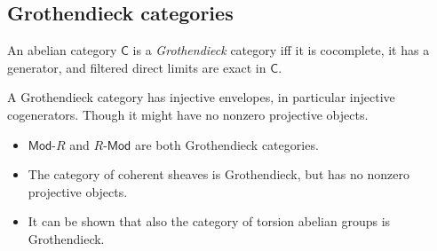 \subsection{Grothendieck categories}
\begin{defn}
	An abelian category $\mathsf{C}$ is a {\em Grothendieck} category iff
	it is cocomplete, it has a generator, and filtered direct limits are exact in $\mathsf{C}$.
\end{defn}

\begin{rem}
	A Grothendieck category has injective envelopes, in particular injective cogenerators.
	Though it might have no nonzero projective objects.
\end{rem}

\begin{ex}\leavevmode\vspace{-.2\baselineskip}
	\begin{itemize}
		\item $\mathsf{Mod}\text{-}R$ and $R\text{-}\mathsf{Mod}$ are both Grothendieck categories.
		\item The category of coherent sheaves is Grothendieck, but has no nonzero projective objects.
		\item It can be shown that also the category of torsion abelian groups is Grothendieck.
	\end{itemize}
\end{ex} 
